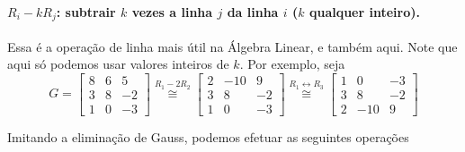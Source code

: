     	\paragraph{$R_i - kR_j$: subtrair $k$ vezes a linha $j$ da linha $i$ ($k$ qualquer inteiro).} 
    	Essa é a operação de linha mais útil na Álgebra Linear, e também aqui. Note que aqui só podemos 
    	usar valores inteiros de $k$. Por exemplo, seja
    	$$
    	G = \begin{bmatrix}
    	8 & 6 & 5 \\
    	3 & 8 & -2 \\
    	1 & 0 & -3
    	\end{bmatrix} \stackrel{R_1 - 2R_2}{\cong} \begin{bmatrix}
    	2 & -10 & 9 \\
    	3 & 8 & -2 \\
    	1 & 0 & -3
    	\end{bmatrix} \stackrel{R_1\leftrightarrow R_3}{\cong} \begin{bmatrix}
    	1 & 0 & -3 \\
    	3 & 8 & -2 \\
    	2 & -10 & 9
    	\end{bmatrix}
    	$$ 
    	\par\vspace{0.3cm} Imitando a eliminação de Gauss, podemos efetuar as seguintes operações
